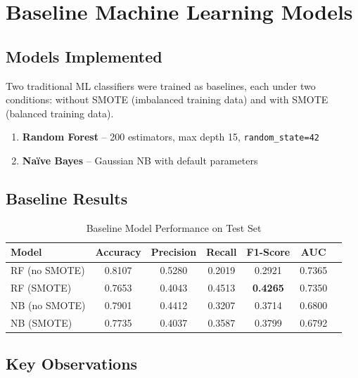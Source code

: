 \documentclass[12pt,a4paper]{article}
\begin{document}
\section{Baseline Machine Learning Models}

\subsection{Models Implemented}

Two traditional ML classifiers were trained as baselines, each under
two conditions: without SMOTE (imbalanced training data) and with SMOTE
(balanced training data).

\begin{enumerate}[leftmargin=1.5cm]
  \item \textbf{Random Forest} -- 200 estimators, max depth 15,
    \texttt{random\_state=42}
  \item \textbf{Naïve Bayes} -- Gaussian NB with default parameters
\end{enumerate}

\subsection{Baseline Results}

\begin{table}[H]
  \centering
  \caption{Baseline Model Performance on Test Set}
  \begin{tabular}{lcccccc}
    \toprule
    \textbf{Model} & \textbf{Accuracy} & \textbf{Precision}
      & \textbf{Recall} & \textbf{F1-Score} & \textbf{AUC} \\
    \midrule
    RF (no SMOTE)  & 0.8107 & 0.5280 & 0.2019 & 0.2921 & 0.7365 \\
    \rowcolor{lightgray}
    RF (SMOTE)     & 0.7653 & 0.4043 & 0.4513 & \textbf{0.4265} & 0.7350 \\
    NB (no SMOTE)  & 0.7901 & 0.4412 & 0.3207 & 0.3714 & 0.6800 \\
    NB (SMOTE)     & 0.7735 & 0.4037 & 0.3587 & 0.3799 & 0.6792 \\
    \bottomrule
  \end{tabular}
\end{table}

\subsection{Key Observations}
\end{document}
